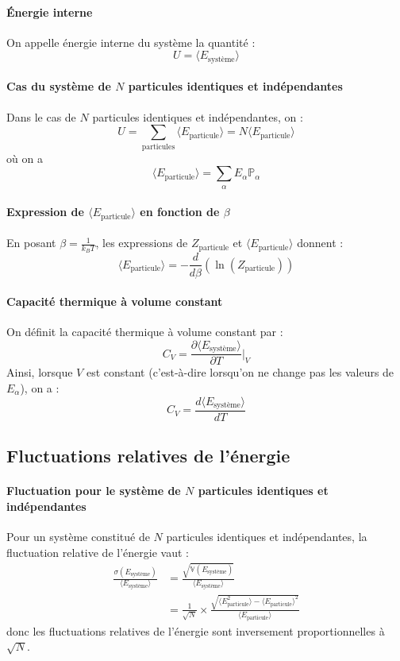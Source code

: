 \documentclass[french]{book}
\theoremstyle{plain}
\theoremstyle{definition}
\theoremstyle{remark}
\renewcommand{\P}{\mathbb{P}}
\begin{document}
\paragraph{Énergie interne} On appelle énergie interne du système la quantité : $$U=\langle E_{\text{système}}\rangle$$

\paragraph{Cas du système de $N$ particules identiques et indépendantes} Dans le cas de $N$ particules identiques et indépendantes, on : $$U=\sum_{\text{particules}}\langle E_{\text{particule}}\rangle=N\langle E_{\text{particule}}\rangle$$ où on a $$\langle E_{\text{particule}}\rangle=\sum_{\alpha}E_\alpha\P_\alpha$$

\paragraph{Expression de $\langle E_{\text{particule}}\rangle$ en fonction de $\beta$} En posant $\beta=\displaystyle\frac{1}{k_BT}$, les expressions de $Z_{\text{particule}}$ et $\langle E_{\text{particule}}\rangle$ donnent : $$\langle E_{\text{particule}}\rangle=-\frac{d}{d\beta}(\ln(Z_{\text{particule}}))$$

\paragraph{Capacité thermique à volume constant} On définit la capacité thermique à volume constant par : $$C_V=\frac{\partial \langle E_{\text{système}}\rangle}{\partial T}\bigg\rvert_V$$ Ainsi, lorsque $V$ est constant (c'est-à-dire lorsqu'on ne change pas les valeurs de $E_\alpha$), on a : $$C_V=\frac{d \langle E_{\text{système}}\rangle}{d T}$$

\subsection{Fluctuations relatives de l'énergie}

\paragraph{Fluctuation pour le système de $N$ particules identiques et indépendantes} Pour un système constitué de $N$ particules identiques et indépendantes, la fluctuation relative de l'énergie vaut : \begin{align*}
	\frac{\sigma(E_\text{système})}{\langle E_\text{système}\rangle}&=\frac{\sqrt{\mathbb{V}(E_\text{système})}}{\langle E_\text{système}\rangle} \\
	&=\frac{1}{\sqrt{N}}\times\frac{\sqrt{\langle E_\text{particule}^2\rangle -\langle E_\text{particule}\rangle^2}}{\langle E_\text{particule}\rangle}
\end{align*}donc les fluctuations relatives de l'énergie sont inversement proportionnelles à $\sqrt{N}$.
\end{document}

